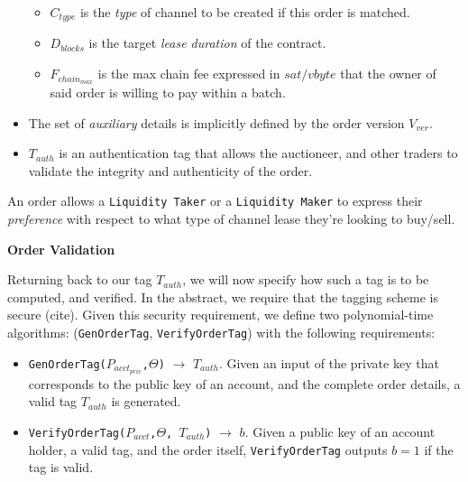 \documentclass[10pt,a4paper]{article}
\theoremstyle{definition}
\begin{document}
\begin{itemize}
\begin{itemize}
        \item $C_{type}$ is the \emph{type} of channel to be created if this
            order is matched.

        \item $D_{blocks}$ is the target \emph{lease duration} of the contract.

        \item $F_{chain_{max}}$ is the max chain fee expressed in $sat/vbyte$
            that the owner of said order is willing to pay within a batch.

    \end{itemize}

    \item The set of \emph{auxiliary} details is implicitly defined by the
        order version $V_{ver}$.

    \item $T_{auth}$ is an authentication tag that allows the auctioneer, and
        other traders to validate the integrity and authenticity of the order.


\end{itemize}

An order allows a \texttt{Liquidity Taker} or a \texttt{Liquidity Maker} to
express their \emph{preference} with respect to what type of channel lease
they're looking to buy/sell.

\begin{center}
\textbf{Order Validation}
\end{center}

Returning back to our tag $T_{auth}$, we will now specify how such a tag is to
be computed, and verified. In the abstract, we require that the tagging scheme
is \seufcma \enspace secure (cite). Given this security requirement, we define
two polynomial-time algorithms: (\texttt{GenOrderTag}, \texttt{VerifyOrderTag})
with the following requirements:

\begin{itemize}
    \item \texttt{GenOrderTag($P_{acct_{priv}}$,$\Theta$)} $\rightarrow$ $T_{auth}$.
        Given an input of the private key that corresponds to the public key of
        an account, and the complete order details, a valid tag $T_{auth}$ is
        generated.

    \item \texttt{VerifyOrderTag($P_{acct}$,$\Theta$, $T_{auth}$)} $\rightarrow$ $b$.
        Given a public key of an account holder, a valid tag, and the order
        itself, \texttt{VerifyOrderTag} outputs $b=1$ if the tag is valid.
\end{itemize}
\end{document}
